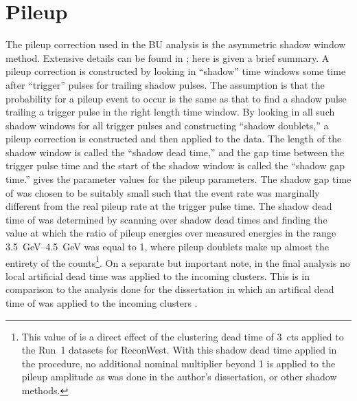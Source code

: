 
\graphicspath{{Body/Figures/Pileup/}{Body/Figures/Pileup/Amplitude/}{Body/Figures/Pileup/TimeShift/}{Body/Figures/Pileup/EnergyModel/}{Body/Figures/Pileup/TriplePileup/}{Body/Figures/Pileup/RateError/}}

\section{Pileup}

The pileup correction used in the BU analysis is the asymmetric shadow window method. Extensive details can be found in ; here is given a brief summary. A pileup correction is constructed by looking in ``shadow'' time windows some time after ``trigger'' pulses for trailing shadow pulses. The assumption is that the probability for a pileup event to occur is the same as that to find a shadow pulse trailing a trigger pulse in the right length time window. By looking in all such shadow windows for all trigger pulses and constructing ``shadow doublets,'' a pileup correction is constructed and then applied to the data. The length of the shadow window is called the ``shadow dead time,'' and the gap time between the trigger pulse time and the start of the shadow window is called the ``shadow gap time.''   gives the parameter values for the pileup parameters. The shadow gap time of  was chosen to be suitably small such that the event rate was marginally different from the real pileup rate at the trigger pulse time. The shadow dead time of  was determined by scanning over shadow dead times and finding the value at which the ratio of pileup energies over measured energies in the range \SIrange{3.5}{4.5}{\GeV} was equal to 1, where pileup doublets make up almost the entirety of the counts\footnote{This value of  is a direct effect of the clustering dead time of 3~cts applied to the Run~1 datasets for ReconWest. With this shadow dead time applied in the procedure, no additional nominal multiplier beyond 1 is applied to the pileup amplitude as was done in the author's dissertation, or other shadow methods.}. On a separate but important note, in the final analysis no local artificial dead time was applied to the incoming clusters. This is in comparison to the analysis done for the dissertation in which an artifical dead time of  was applied to the incoming clusters \cite{phdthesis:2020Kinnaird}.


